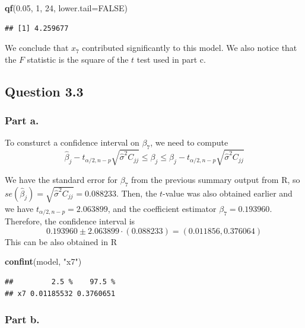 \documentclass[
  11pt,
]{article}
\newenvironment{Shaded}{\begin{snugshade}}{\end{snugshade}}
\newcommand{\AttributeTok}[1]{\textcolor[rgb]{0.13,0.29,0.53}{#1}}
\newcommand{\ConstantTok}[1]{\textcolor[rgb]{0.56,0.35,0.01}{#1}}
\newcommand{\DecValTok}[1]{\textcolor[rgb]{0.00,0.00,0.81}{#1}}
\newcommand{\FloatTok}[1]{\textcolor[rgb]{0.00,0.00,0.81}{#1}}
\newcommand{\FunctionTok}[1]{\textcolor[rgb]{0.13,0.29,0.53}{\textbf{#1}}}
\newcommand{\NormalTok}[1]{#1}
\newcommand{\StringTok}[1]{\textcolor[rgb]{0.31,0.60,0.02}{#1}}
\begin{document}
\begin{Shaded}
\begin{Highlighting}[]
\FunctionTok{qf}\NormalTok{(}\FloatTok{0.05}\NormalTok{, }\DecValTok{1}\NormalTok{, }\DecValTok{24}\NormalTok{, }\AttributeTok{lower.tail=}\ConstantTok{FALSE}\NormalTok{)}
\end{Highlighting}
\end{Shaded}

\begin{verbatim}
## [1] 4.259677
\end{verbatim}

We conclude that \(x_7\) contributed significantly to this model. We
also notice that the \(F\) statistic is the square of the \(t\) test
used in part c.

\subsection{Question 3.3}\label{question-3.3-1}

\subsubsection{Part a.}\label{part-a.-2}

To consturct a confidence interval on \(\beta_7\), we need to compute
\[\hat{\beta}_j - t_{\alpha/2,n-p}\sqrt{\hat{\sigma}^2C_{jj}} \leq \beta_j \leq \hat{\beta}_j - t_{\alpha/2,n-p}\sqrt{\hat{\sigma}^2C_{jj}}\]

We have the standard error for \(\beta_7\) from the previous summary
output from R, so
\(se(\hat{\beta}_j) = \sqrt{\hat{\sigma}^2C_{jj}} = 0.088233\). Then,
the \(t\)-value was also obtained earlier and we have
\(t_{\alpha/2, n-p} = 2.063899\), and the coefficient estimator
\(\hat{\beta_7} = 0.193960\). Therefore, the confidence interval is
\[0.193960 \pm 2.063899 \cdot(0.088233) = (0.011856, 0.376064)\] This
can be also obtained in R

\begin{Shaded}
\begin{Highlighting}[]
\FunctionTok{confint}\NormalTok{(model, }\StringTok{"x7"}\NormalTok{)}
\end{Highlighting}
\end{Shaded}

\begin{verbatim}
##         2.5 %    97.5 %
## x7 0.01185532 0.3760651
\end{verbatim}

\subsubsection{Part b.}\label{part-b.-2}
\end{document}
